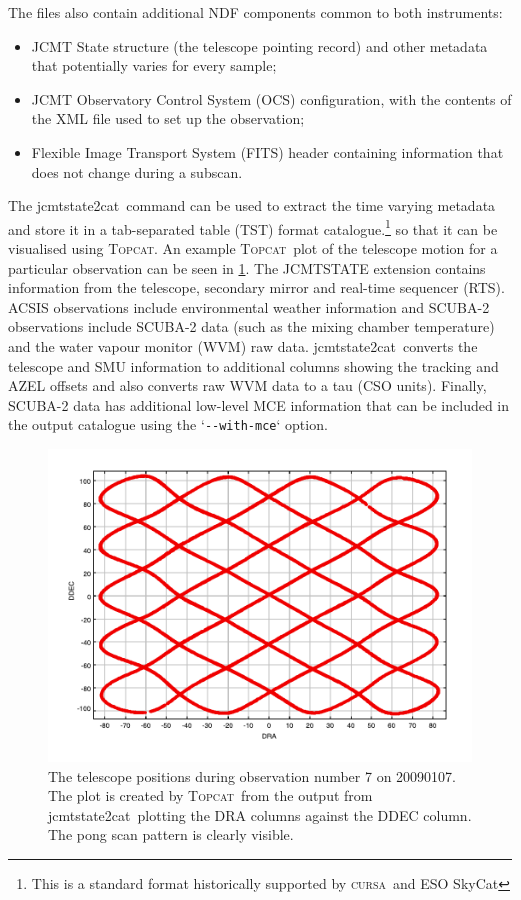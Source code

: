 \documentclass[twoside,11pt]{article}
\newcommand{\xref}[3]{#1}
\renewcommand{\_}{\texttt{\symbol{95}}}
\newcommand{\CURSA}{\xref{\textsc{cursa}}{sun190}{}}
\newcommand{\task}[1]{\textsf{#1}}
\newcommand{\jcmtstate}{\xref{\task{jcmtstate2cat}}{sun258}{JCMTSTATE2CAT}}
\newcommand{\topcat}{\xref{\textsc{Topcat}}{sun253}{}}
\begin{document}
The files also contain additional NDF components common to both
instruments:
\begin{itemize}
\item JCMT State structure (the telescope pointing record) and other
  metadata that potentially varies for every sample;
\item JCMT Observatory Control System (OCS) configuration, with the
  contents of the XML file used to set up the observation;
\item Flexible Image Transport System (FITS) header containing
  information that does not change during a subscan.
\end{itemize}

The \jcmtstate\ command can be used to extract the time varying
metadata and store it in a tab-separated table
(\xref{TST}{sun190}{ACCESS}) format catalogue.\footnote{This is a
  standard format historically supported by \CURSA\ and ESO SkyCat} so
that it can be visualised using \topcat. An example \topcat\ plot of the
telescope motion for a particular observation can be seen in
\ref{fig:topcat}. The JCMTSTATE extension contains information from
the telescope, secondary mirror and real-time sequencer (RTS). ACSIS
observations include environmental weather information and SCUBA-2
observations include SCUBA-2 data (such as the mixing chamber
temperature) and the water vapour monitor (WVM) raw data. \jcmtstate\
converts the telescope and SMU information to additional columns
showing the tracking and AZEL offsets and also converts raw WVM data
to a tau (CSO units). Finally, SCUBA-2 data has additional low-level
MCE information that can be included in the output catalogue using the
`\verb+--with-mce+` option.

\begin{figure}
\begin{center}
\includegraphics{sun258_scan_pattern}
\caption{The telescope positions during observation number 7 on
  20090107. The plot is created by \topcat\ from the output from
\jcmtstate\ plotting the DRA columns against the DDEC column. The pong
scan pattern is clearly visible.}
\label{fig:topcat}
\end{center}
\end{figure}
\end{document}
